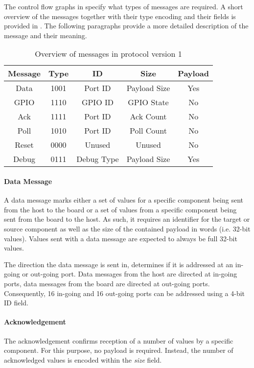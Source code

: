 \documentclass{report}
\begin{document}
The control flow graphs in  specify what types of messages are required. A short overview of the messages together with their type encoding and their fields is provided in . The following paragraphs provide a more detailed description of the message and their meaning.

\begin{table}[h]
\centering
\begin{tabular}{ c | c | c | c | c } 
Message & Type & ID & Size & Payload\\ \hline
Data & 1001 & Port ID & Payload Size & Yes\\
GPIO & 1110 & GPIO ID & GPIO State & No\\
Ack & 1111 & Port ID & Ack Count & No\\
Poll & 1010 & Port ID & Poll Count & No\\
Reset & 0000 & Unused & Unused & No\\
Debug & 0111 & Debug Type & Payload Size & Yes
 \end{tabular}
\caption{Overview of messages in protocol version 1}
\label{tab:proto:messages}
\end{table}

\paragraph{Data Message}
A data message marks either a set of values for a specific component being sent from the host to the board or a set of values from a specific component being sent from the board to the host. As such, it requires an identifier for the target or source component as well as the size of the contained payload in words (i.e. 32-bit values). 
Values sent with a data message are expected to always be full 32-bit values.

The direction the data message is sent in, determines if it is addressed at an in-going or out-going port. Data messages from the host are directed at in-going ports, data messages from the board are directed at out-going ports. Consequently, 16 in-going and 16 out-going ports can be addressed using a 4-bit ID field.

\paragraph{Acknowledgement}
The acknowledgement confirms reception of a number of values by a specific component. For this purpose, no payload is required. Instead, the number of acknowledged values is encoded within the \textit{size} field.
\end{document}
